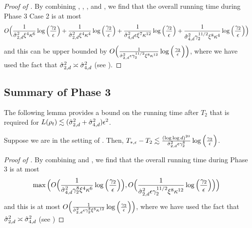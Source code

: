 \begin{proof}[Proof of ]
By combining , , , and , we find that the overall running time during Phase 3 Case 2 is at most
\begin{align}
O\Big(\frac{1}{\hat{\sigma}_{2, d}^2 \xi^4 \kappa^6} \log\Big(\frac{\gamma_2}{\epsilon}\Big)
+ \frac{1}{\hat{\sigma}_{2, d}^2 \xi^4 \kappa^4} \log\Big(\frac{\gamma_2}{\epsilon}\Big)
+ \frac{1}{\hat{\sigma}_{4, d}^2 \epsilon \xi^7 \kappa^{12}} \log\Big(\frac{\gamma_2}{\epsilon}\Big)
+ \frac{1}{\hat{\sigma}_{4, d}^2 \gamma_2^{11/2} \xi^8 \kappa^4} \log\Big(\frac{\gamma_2}{\epsilon}\Big)\Big)
\end{align}
and this can be upper bounded by $O\Big(\frac{1}{\hat{\sigma}_{2, d}^2 \epsilon \gamma_2^{11/2}\xi^8 \kappa^{12}} \log\Big(\frac{\gamma_2}{\epsilon}\Big)\Big)$, where we have used the fact that $\hat{\sigma}_{2, d}^2 \asymp \hat{\sigma}_{4, d}^2$ (see ).
\end{proof}

\subsection{Summary of Phase 3}

The following lemma provides a bound on the running time after $T_2$ that is required for $L(\rho_t) \lesssim (\hat{\sigma}_{2, d}^2 + \hat{\sigma}_{4, d}^2) \epsilon^2$.

\begin{lemma}[Phase 3]\label{lemma:phase_3_runtime}
Suppose we are in the setting of . Then, $T_{*, \epsilon} - T_2 \lesssim \frac{(\log \log d)^{20}}{\hat{\sigma}_{2, d}^2 \epsilon \gamma_2^8} \log\Big(\frac{\gamma_2}{\epsilon}\Big)$.
\end{lemma}

\begin{proof}[Proof of ]
By combining  and , we find that the overall running time during Phase 3 is at most
\begin{align}
\max\Big(O\Big(\frac{1}{\hat{\sigma}_{4, d}^2 \gamma_2^8 \xi^4 \kappa^6} \log\Big(\frac{\gamma_2}{\epsilon}\Big)\Big), O\Big(\frac{1}{\hat{\sigma}_{2, d}^2 \epsilon \gamma_2^{11/2}\xi^8 \kappa^{12}} \log\Big(\frac{\gamma_2}{\epsilon}\Big)\Big)\Big)
\end{align}
and this is at most $O\Big(\frac{1}{\hat{\sigma}_{2, d}^2 \epsilon \gamma_2^8 \xi^8 \kappa^{12}} \log\Big(\frac{\gamma_2}{\epsilon}\Big)\Big)$, where we have used the fact that $\hat{\sigma}_{2, d}^2 \asymp \hat{\sigma}_{4, d}^2$ (see )
\end{proof}

